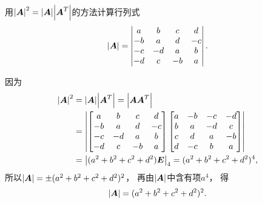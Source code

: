 \begin{example}
用\(\abs{\boldsymbol{A}}^2 = \abs{\boldsymbol{A}} \abs{\boldsymbol{A}^T}\)的方法计算行列式\begin{equation*}
	\abs{\boldsymbol{A}} = \begin{vmatrix}
		a & b & c & d \\
		-b & a & d & -c \\
		-c & -d & a & b \\
		-d & c & -b & a
	\end{vmatrix}.
\end{equation*}
\begin{solution}
因为\begin{align*}
	\abs{\boldsymbol{A}}^2 &= \abs{\boldsymbol{A}} \abs{\boldsymbol{A}^T} = \abs{\boldsymbol{A} \boldsymbol{A}^T} \\
	&= \abs{\begin{bmatrix}
		a & b & c & d \\
		-b & a & d & -c \\
		-c & -d & a & b \\
		-d & c & -b & a
	\end{bmatrix}
	\begin{bmatrix}
		a & -b & -c & -d \\
		b & a & -d & c \\
		c & d & a & -b \\
		d & -c & b & a
	\end{bmatrix}} \\
	&= \abs{(a^2+b^2+c^2+d^2) \boldsymbol{E}}_4
	= (a^2+b^2+c^2+d^2)^4,
\end{align*}
所以\(\abs{\boldsymbol{A}} = \pm(a^2+b^2+c^2+d^2)^2\)，
再由\(\abs{\boldsymbol{A}}\)中含有项\(a^4\)，
得\begin{equation*}
	\abs{\boldsymbol{A}} = (a^2+b^2+c^2+d^2)^2.
\end{equation*}
\end{solution}
\end{example}

